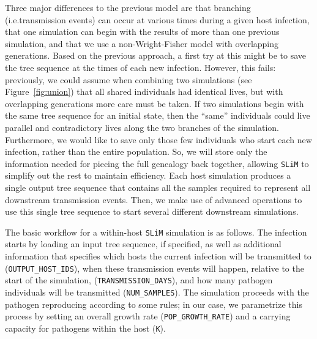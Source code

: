 \documentclass[12pt]{article}
\newcommand{\slim}[0]{\texttt{SLiM}\xspace}
\newcommand*{\ie}{i.e.\xcomma}
\begin{document}
Three major differences to the previous model are that branching (\ie transmission events) can occur at various times during a given host infection,
that one simulation can begin with the results of more than one previous simulation,
and that we use a non-Wright-Fisher model with overlapping generations.
Based on the previous approach,
a first try at this might be to save the tree sequence at the times of each new infection.
However, this fails:
previously, we could assume when combining two simulations
(see Figure~\ref{fig:union}) that all shared individuals had identical lives,
but with overlapping generations more care must be taken.
If two simulations begin with the same tree sequence for an initial state,
then the ``same'' individuals could live parallel and contradictory lives along the two branches of the simulation.
Furthermore, we would like to save only those few individuals who start each new infection,
rather than the entire population.
So, we will store only the information needed for piecing the full genealogy back together, allowing \slim to simplify out the rest to maintain efficiency.
Each host simulation produces a single output tree sequence
that contains all the samples required to represent all downstream transmission events.
Then, we make use of advanced operations to use this single tree sequence
to start several different downstream simulations.

The basic workflow for a within-host \slim simulation is as follows. The infection starts by loading an input tree sequence, if specified,
as well as additional information that specifies which hosts the current infection will be transmitted to (\verb|OUTPUT_HOST_IDS|),
when these transmission events will happen, relative to the start of the simulation, (\verb|TRANSMISSION_DAYS|),
and how many pathogen individuals will be transmitted (\verb|NUM_SAMPLES|).
The simulation proceeds with the pathogen reproducing according
to some rules; in our case, we parametrize this process by setting an overall growth rate (\verb|POP_GROWTH_RATE|)
and a carrying capacity for pathogens within the host (\verb|K|).
\end{document}
